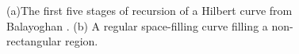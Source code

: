 \documentclass[12pt]{article}
\begin{document}
\begin{figure}[h!]

 \begin{center} 
  \parbox{110mm}{\caption{\label{hilbert} (a)The first five stages of
  recursion of a Hilbert curve \cite{hilbert-orig} from Balayoghan
  \cite{texas-hilbert}. (b) A regular space-filling curve filling a
  non-rectangular region.}}
\end{center}
\end{figure}
\end{document}
